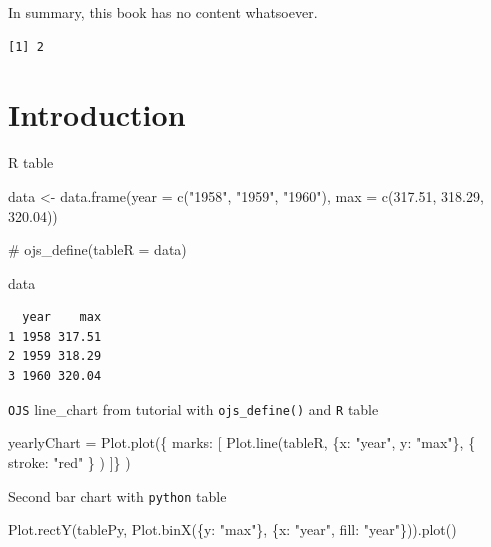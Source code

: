 \documentclass[
  a4paper,
]{scrbook}
\newenvironment{Shaded}{}{}
\newcommand{\AttributeTok}[1]{\textcolor[rgb]{0.84,0.23,0.29}{#1}}
\newcommand{\CommentTok}[1]{\textcolor[rgb]{0.42,0.45,0.49}{#1}}
\newcommand{\FloatTok}[1]{\textcolor[rgb]{0.00,0.36,0.77}{#1}}
\newcommand{\FunctionTok}[1]{\textcolor[rgb]{0.44,0.26,0.76}{#1}}
\newcommand{\NormalTok}[1]{\textcolor[rgb]{0.14,0.16,0.18}{#1}}
\newcommand{\OtherTok}[1]{\textcolor[rgb]{0.44,0.26,0.76}{#1}}
\newcommand{\StringTok}[1]{\textcolor[rgb]{0.01,0.18,0.38}{#1}}
\begin{document}
In summary, this book has no content whatsoever.

\begin{verbatim}
[1] 2
\end{verbatim}

\hypertarget{introduction}{%
\chapter{Introduction}\label{introduction}}

R table

\begin{Shaded}
\begin{Highlighting}[numbers=left,,]
\NormalTok{data }\OtherTok{\textless{}{-}} \FunctionTok{data.frame}\NormalTok{(}\AttributeTok{year =}  \FunctionTok{c}\NormalTok{(}\StringTok{"1958"}\NormalTok{, }\StringTok{"1959"}\NormalTok{, }\StringTok{"1960"}\NormalTok{), }
                   \AttributeTok{max =} \FunctionTok{c}\NormalTok{(}\FloatTok{317.51}\NormalTok{, }\FloatTok{318.29}\NormalTok{, }\FloatTok{320.04}\NormalTok{))}

\CommentTok{\# ojs\_define(tableR = data)}

\NormalTok{data}
\end{Highlighting}
\end{Shaded}

\begin{verbatim}
  year    max
1 1958 317.51
2 1959 318.29
3 1960 320.04
\end{verbatim}

\texttt{OJS} line\_chart from tutorial with \texttt{ojs\_define()} and
\texttt{R} table

\begin{Shaded}
\begin{Highlighting}[numbers=left,,]
\NormalTok{yearlyChart = Plot.plot(\{}
\NormalTok{  marks: [}
\NormalTok{    Plot.line(tableR, }
\NormalTok{      \{x: "year", y: "max"\}, }
\NormalTok{      \{ stroke: "red" \}}
\NormalTok{    )}
\NormalTok{  ]\}}
\NormalTok{)}
\end{Highlighting}
\end{Shaded}

Second bar chart with \texttt{python} table

\begin{Shaded}
\begin{Highlighting}[numbers=left,,]

\NormalTok{Plot.rectY(tablePy, Plot.binX(\{y: "max"\}, \{x: "year", fill: "year"\})).plot()}
\end{Highlighting}
\end{Shaded}
\end{document}
